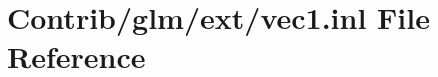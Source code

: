 \hypertarget{ext_2vec1_8inl}{}\section{Contrib/glm/ext/vec1.inl File Reference}
\label{ext_2vec1_8inl}
